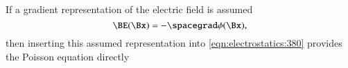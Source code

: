 %
%

If a gradient representation of the electric field is assumed
\begin{dmath}\label{eqn:electrostatics_electricPotential:561}
\BE(\Bx) = -\spacegrad \phi(\Bx),
\end{dmath}
then
inserting
this assumed representation into \cref{eqn:electrostatics:380} provides the
Poisson equation directly
